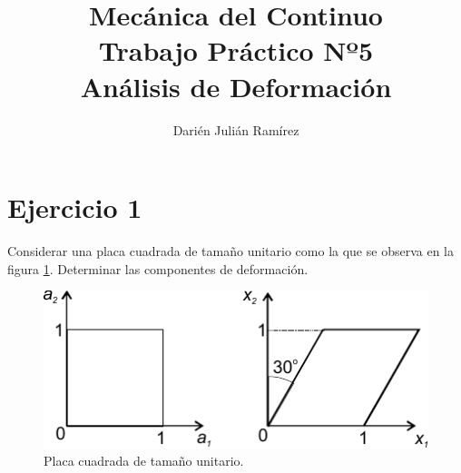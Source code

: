 \documentclass[a4paper,10pt,twoside,final,spanish]{article}
\title{\Huge Mecánica del Continuo \\
			 Trabajo Práctico Nº5  \\
			 Análisis de Deformación}
\author{Darién Julián Ramírez}
\date{}
\begin{document}
\maketitle %

\section*{Ejercicio 1}

Considerar una placa cuadrada de tamaño unitario como la que se observa en la figura \ref{fig:ej1}. 
Determinar las componentes de deformación. 

\begin{figure}[htbp]
\centerline{\includegraphics[scale=1.25]{ej1}}
\caption{Placa cuadrada de tamaño unitario.}
\label{fig:ej1}
\end{figure}

\dotfill
\end{document}
